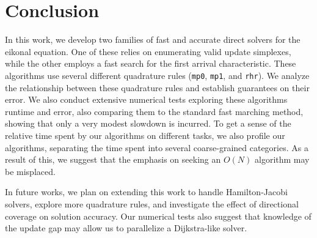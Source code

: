\documentclass[eikonal.tex]{subfiles}
\begin{document}
\section{Conclusion}

In this work, we develop two families of fast and accurate direct
solvers for the eikonal equation. One of these relies on enumerating
valid update simplexes, while the other employs a fast search for the
first arrival characteristic. These algorithms use several different
quadrature rules (\texttt{mp0}, \texttt{mp1}, and \texttt{rhr}). We
analyze the relationship between these quadrature rules and establish
guarantees on their error. We also conduct extensive numerical tests
exploring these algorithms runtime and error, also comparing them to
the standard fast marching method, showing that only a very modest
slowdown is incurred. To get a sense of the relative time spent by our
algorithms on different tasks, we also profile our algorithms,
separating the time spent into several coarse-grained categories. As a
result of this, we suggest that the emphasis on seeking an $O(N)$
algorithm may be misplaced.

In future works, we plan on extending this work to handle
Hamilton-Jacobi solvers, explore more quadrature rules, and
investigate the effect of directional coverage on solution
accuracy. Our numerical tests also suggest that knowledge of the
update gap may allow us to parallelize a Dijkstra-like solver.
\end{document}
